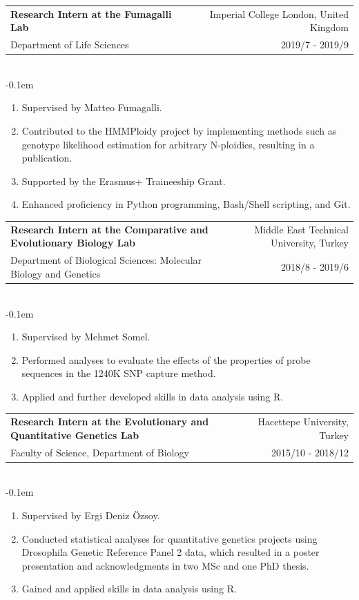 \documentclass[letterpaper,10.5pt]{article}
\makeatletter
\newcommand{\cvSubheading}[5]{
  \vspace{-1pt}\item
    \begin{tabular*}{0.97\textwidth}{l@{\extracolsep{\fill}}r}
      \textbf{#1} & #2 \\
      {\small#3} & {\small #4} \\
    \end{tabular*}\vspace{3pt} \\
    #5
}
\makeatother
\begin{document}
 
        \cvSubheading
        {Research Intern at the Fumagalli Lab}
        {Imperial College London, United Kingdom}
        {Department of Life Sciences}
        {2019/7 - 2019/9}
          \vspace{-0.1em} \begin{enumerate}[label=\textbf{-},nosep,wide,  labelindent=0pt]
        \item Supervised by Matteo Fumagalli.
        \item Contributed to the HMMPloidy project by implementing methods such as genotype likelihood estimation for arbitrary N-ploidies, resulting in a publication.
        \item Supported by the Erasmus+ Traineeship Grant.
        \item Enhanced proficiency in Python programming, Bash/Shell scripting, and Git.
        \end{enumerate}
    \medskip

    
        \cvSubheading
        {Research Intern at the Comparative and Evolutionary Biology Lab}
        {Middle East Technical University, Turkey}
        {Department of Biological Sciences: Molecular Biology and Genetics}
        {2018/8 - 2019/6}
          \vspace{-0.1em} \begin{enumerate}[label=\textbf{-},nosep,wide,  labelindent=0pt]
        \item Supervised by Mehmet Somel.
        \item Performed analyses to evaluate the effects of the properties of probe sequences in the 1240K SNP capture method.
        \item Applied and further developed skills in data analysis using R.
        \end{enumerate}
    
    \medskip

        \cvSubheading
        {Research Intern at the Evolutionary and Quantitative Genetics Lab}
        {Hacettepe University, Turkey}
        {Faculty of Science, Department of Biology}
        {2015/10 - 2018/12}
          \vspace{-0.1em} \begin{enumerate}[label=\textbf{-},nosep,wide,  labelindent=0pt]
        \item Supervised by Ergi Deniz \"{O}zsoy.
        \item Conducted statistical analyses for quantitative genetics projects using Drosophila Genetic Reference Panel 2 data, which resulted in a poster presentation and acknowledgments in two MSc and one PhD thesis.
        \item Gained and applied skills in data analysis using R.
        \end{enumerate}
\end{document}
